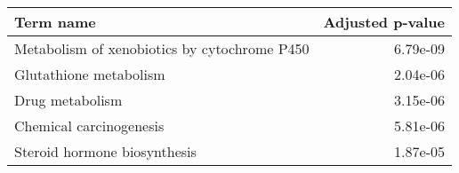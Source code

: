 \begin{tabular}{lr}
\toprule
                                   Term name &  Adjusted p-value \\
\midrule
Metabolism of xenobiotics by cytochrome P450 &          6.79e-09 \\
                      Glutathione metabolism &          2.04e-06 \\
                             Drug metabolism &          3.15e-06 \\
                     Chemical carcinogenesis &          5.81e-06 \\
                Steroid hormone biosynthesis &          1.87e-05 \\
\bottomrule
\end{tabular}
